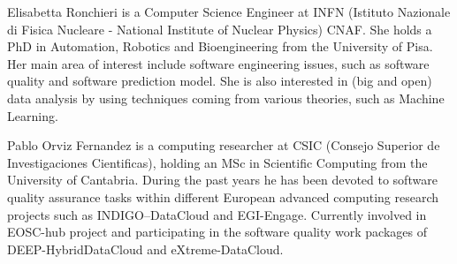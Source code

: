 \documentclass[journal]{IEEEtran}
\begin{document}
\begin{IEEEbiography} {Elisabetta Ronchieri}
is a Computer Science Engineer at INFN (Istituto Nazionale di Fisica Nucleare - National Institute of Nuclear Physics) CNAF. She holds a PhD in Automation, Robotics and Bioengineering from the University of Pisa. Her main area of interest include software engineering issues, such as software quality and software prediction model. She is also interested in (big and open) data analysis by using techniques coming from various theories, such as Machine Learning.
\end{IEEEbiography}

\begin{IEEEbiography}{Pablo Orviz Fernandez}
is a computing researcher at CSIC (Consejo Superior de Investigaciones
Cientificas), holding an MSc in Scientific Computing from the University of
Cantabria. During the past years he has been devoted to software quality
assurance tasks within different European advanced computing research projects
such as INDIGO--DataCloud and EGI-Engage. Currently involved in EOSC-hub project
and participating in the software quality work packages of DEEP-HybridDataCloud
and eXtreme-DataCloud.
\end{IEEEbiography}
\end{document}
